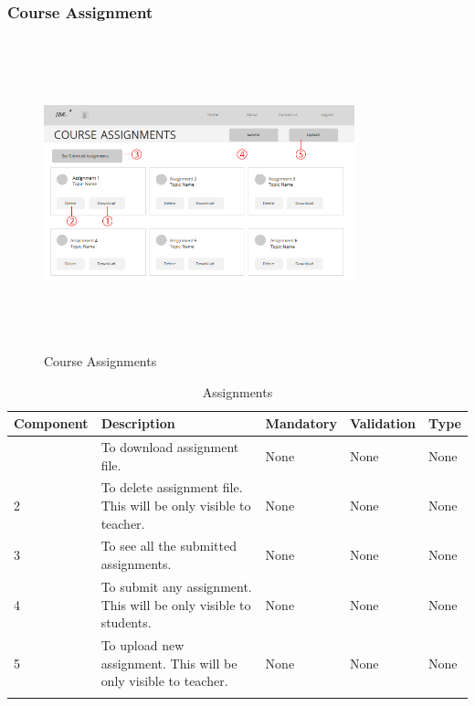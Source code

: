 \documentclass[12pt]{article}
\begin{document}
\subsubsection{Course Assignment}
\begin{figure}[H]
  \centering
  \includegraphics[width=9cm, height=9cm]{CourseAssignmentPage(Teacher)}
  \caption{Course Assignments}
\end{figure}
\begin{longtable}{|>{\raggedright\arraybackslash}p{2.5cm}|>{\raggedright\arraybackslash}p{4cm}|>{\raggedright\arraybackslash}p{2.2cm}|>{\raggedright\arraybackslash}p{2cm}|>{\raggedright\arraybackslash}p{2cm}|}
\hline
\textbf{Component} & \textbf{Description} & \textbf{Mandatory} & \textbf{Validation} & \textbf{Type}\\
\hline
1 &
To download assignment file. &
None &
None &
None \\
\hline

2 &
To delete assignment file. This will be only visible to teacher. &
None &
None &
None \\
\hline

3 &
To see all the submitted assignments. &
None &
None &
None \\
\hline

4 &
To submit any assignment. This will be only visible to students. &
None &
None &
None \\
\hline

5 &
To upload new assignment. This will be only visible to teacher. &
None &
None &
None \\
\hline

\caption{Assignments}
\end{longtable}
\end{document}
